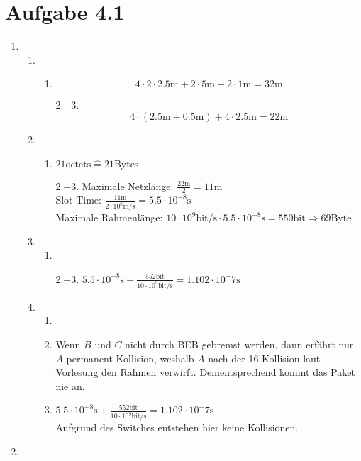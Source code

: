 \documentclass[12pt, a4paper]{article}
\begin{document}
\section*{Aufgabe 4.1}
\begin{enumerate}[label=\alph*)]
	\item	\begin{enumerate}[label=\roman*)]
				\item	\begin{enumerate}[label=\arabic*.]
							\item		$$4 \cdot 2 \cdot 2.5 \text{m} + 2 \cdot 5 \text{m} + 2 \cdot 1 \text{m} = 32 \text{m}$$
							\item[2.+3.]$$4 \cdot (2.5 \text{m} + 0.5 \text{m}) + 4 \cdot 2.5 \text{m} = 22 \text{m}$$
						\end{enumerate}
				\item	\begin{enumerate}[label=\arabic*.]
							\item		$21 \text{octets} \hat{=} 21 \text{Bytes}$
							\item[2.+3.]Maximale  Netzlänge: $\frac{22 \text{m}}{2} = 11 \text{m}$ \\
										Slot-Time: $\frac{11 \text{m}}{2 \cdot 10^8 \text{m/s}} = 5.5 \cdot 10^{-8} \text{s}$ \\
										Maximale Rahmenlänge: $10 \cdot 10^9 \text{bit/s} \cdot 5.5 \cdot 10^{-8} \text{s} = 550 \text{bit} \Rightarrow 69 \text{Byte}$
						\end{enumerate}
				\item	\begin{enumerate}[label=\arabic*.]
							\item		
							\item[2.+3.]$5.5 \cdot 10^{-8} \text{s} + \frac{552 \text{bit}}{10 \cdot 10^9 \text{bit/s}} = 1.102 \cdot 10^-7 \text{s}$
						\end{enumerate}
				\item	\begin{enumerate}[label=\arabic*.]
							\item	
							\item	Wenn $B$ und $C$ nicht durch BEB gebremst werden, dann erfährt nur $A$ permanent Kollision, weshalb $A$ nach der 16 Kollision laut Vorlesung den Rahmen verwirft. Dementsprechend kommt das Paket nie an.
							\item	$5.5 \cdot 10^{-8} \text{s} + \frac{552 \text{bit}}{10 \cdot 10^9 \text{bit/s}} = 1.102 \cdot 10^-7 \text{s}$\\
									Aufgrund des Switches entstehen hier keine Kollisionen.
						\end{enumerate}	
			\end{enumerate}
	\item	
\end{enumerate}
\end{document}
